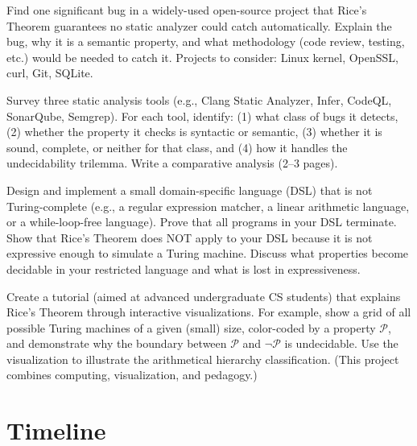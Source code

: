 \begin{exercise}[Research]
Find one significant bug in a widely-used open-source project that Rice's Theorem guarantees no static analyzer could catch automatically. Explain the bug, why it is a semantic property, and what methodology (code review, testing, etc.) would be needed to catch it. Projects to consider: Linux kernel, OpenSSL, curl, Git, SQLite.
\end{exercise}

\begin{exercise}[Research]
Survey three static analysis tools (e.g., Clang Static Analyzer, Infer, CodeQL, SonarQube, Semgrep). For each tool, identify: (1) what class of bugs it detects, (2) whether the property it checks is syntactic or semantic, (3) whether it is sound, complete, or neither for that class, and (4) how it handles the undecidability trilemma. Write a comparative analysis (2--3 pages).
\end{exercise}

\begin{exercise}[Project]
Design and implement a small domain-specific language (DSL) that is not Turing-complete (e.g., a regular expression matcher, a linear arithmetic language, or a while-loop-free language). Prove that all programs in your DSL terminate. Show that Rice's Theorem does NOT apply to your DSL because it is not expressive enough to simulate a Turing machine. Discuss what properties become decidable in your restricted language and what is lost in expressiveness.
\end{exercise}

\begin{exercise}[Project]
Create a tutorial (aimed at advanced undergraduate CS students) that explains Rice's Theorem through interactive visualizations. For example, show a grid of all possible Turing machines of a given (small) size, color-coded by a property $\mathcal{P}$, and demonstrate why the boundary between $\mathcal{P}$ and $\neg\mathcal{P}$ is undecidable. Use the visualization to illustrate the arithmetical hierarchy classification. (This project combines computing, visualization, and pedagogy.)
\end{exercise}

\section{Timeline}
\label{sec:rice:timeline}

